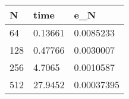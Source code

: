 \begin{tabular}{lll}
N & time & e_N \\ 
\hline 
64 & 0.13661 & 0.0085233 \\ 
128 & 0.47766 & 0.0030007 \\ 
256 & 4.7065 & 0.0010587 \\ 
512 & 27.9452 & 0.00037395 \\ 
\hline 
\end{tabular}